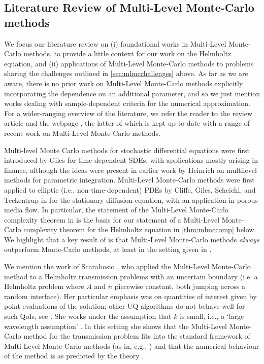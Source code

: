 \subsection{Literature Review of Multi-Level Monte-Carlo methods}
We focus our literature review on (i) foundational works in Multi-Level Monte-Carlo methods, to provide a little context for our work on the Helmholtz equation, and (ii) applications of Multi-Level Monte-Carlo methods to problems sharing the challenges outlined in \cref{sec:mlmcchallenges} above. As far as we are aware, there is no prior work on Multi-Level Monte-Carlo methods explicitly incorporating the dependence on an additional parameter, and so we just mention works dealing with sample-dependent criteria for the numerical approximation. For a wider-ranging overview of the literature, we refer the reader to the review article \cite{Gi:15} and the webpage \cite{Gi}, the latter of which is kept up-to-date with a range of recent work on Multi-Level Monte-Carlo methods.

Multi-level Monte Carlo methods for stochastic differential equations were first introduced by Giles \cite{Gi:08} for time-dependent SDEs, with applications mostly arising in finance, although the ideas were present in earlier work by Heinrich \cite{He:98,He:01} on multilevel methods for parametric integration. Multi-Level Monte-Carlo methods were first applied to elliptic (i.e., non-time-dependent) PDEs by Cliffe, Giles, Scheichl, and Teckentrup in \cite{ClGiScTe:11} for the stationary diffusion equation, with an application in porous media flow. In particular, the statement of the Multi-Level Monte-Carlo complexity theorem in \cite[Theorem 1]{ClGiScTe:11} is the basis for our statement of a Multi-Level Monte-Carlo complexity theorem for the Helmholtz equation in \cref{thm:mlmccomp} below. We highlight that a key result of \cite[Theorem 1]{ClGiScTe:11} is that Multi-Level Monte-Carlo methods \emph{always} outperform Monte-Carlo methods, at least in the setting given in \cite{ClGiScTe:11}.

We mention the work of Scarabosio \cite{Sc:17}, who applied the Multi-Level Monte-Carlo method to a Helmholtz transmission problems with an uncertain boundary (i.e. a Helmholtz problem where $A$ and $n$ piecewise constant, both jumping across a random interface). Her particular emphasis was on quantities of interest given by point evaluations of the solution; other UQ algorithms do not behave well for such QoIs, see \cite[Section 3.3]{Sc:17}. She works under the assumption that $k$ is small, i.e., a `large wavelength assumption' \cite[Assumption 3.1]{Sc:17}.  In this setting she shows that the Multi-Level Monte-Carlo method for the transmission problem fits into the standard framework of Multi-Level Monte-Carlo methods \cite[Proposition 4.2]{Sc:17} (as in, e.g., \cite{ClGiScTe:11,Gi:15}) and that the numerical behaviour of the method is as predicted by the theory \cite[Section 6]{Sc:17}.

